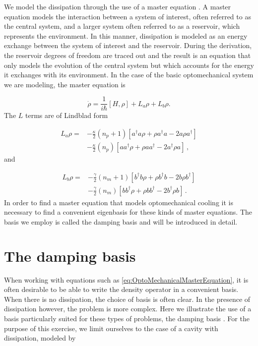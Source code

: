\documentclass[12pt]{article}
\begin{document}
We model the dissipation through the use of a master equation \cite{CarmichaelQuantumOptics1999}. A master equation models the interaction between a system of interest, often referred to as the central system, and a larger system often referred to as a reservoir, which represents the environment. In this manner, dissipation is modeled as an energy exchange between the system of interest and the reservoir. During the derivation, the reservoir degrees of freedom are traced out and the result is an equation that only models the evolution of the central system but which accounts for the energy it exchanges with its environment. In the case of the basic optomechanical system we are modeling, the master equation is

\begin{equation} \label{eq:OptoMechanicalMasterEquation}
\dot{\rho} = \frac{1}{i\hbar}[H,\rho] +L_a\rho + L_b \rho.
\end{equation} The $L$ terms are of Lindblad form 

\begin{align}
L_a \rho =& - \frac{\kappa}{2}(n_p + 1)[a^\dagger a\rho + \rho a^\dagger a -2a\rho a^\dagger]  \\
 &- \frac{\kappa}{2}(n_p)[ aa^\dagger\rho + \rho  aa^\dagger -2a^\dagger\rho a]\, ,\nonumber
\end{align} and

\begin{align}
L_b \rho =& - \frac{\gamma}{2}(n_m + 1)[b^\dagger b\rho + \rho b^\dagger b -2b\rho b^\dagger]  \\
 &- \frac{\gamma}{2}(n_m)[ bb^\dagger\rho + \rho  bb^\dagger -2b^\dagger\rho b]\, .\nonumber
\end{align} In order to find a master equation that models optomechanical cooling it is necessary to find a convenient eigenbasis for these kinds of master equations. The basis we employ is called the damping basis and will be introduced in detail. 

\section{The damping basis}

When working with equations such as \ref{eq:OptoMechanicalMasterEquation}, it is often desirable to be able to write the density operator in a convenient basis. When there is no dissipation, the choice of basis is often clear. In the presence of dissipation however, the problem is more complex. Here we illustrate the use of a basis particularly suited for these types of problems, the damping basis \cite{BriegelDampingBasis1993}. For the purpose of this exercise, we limit ourselves to the case of a cavity with dissipation, modeled by
\end{document}
